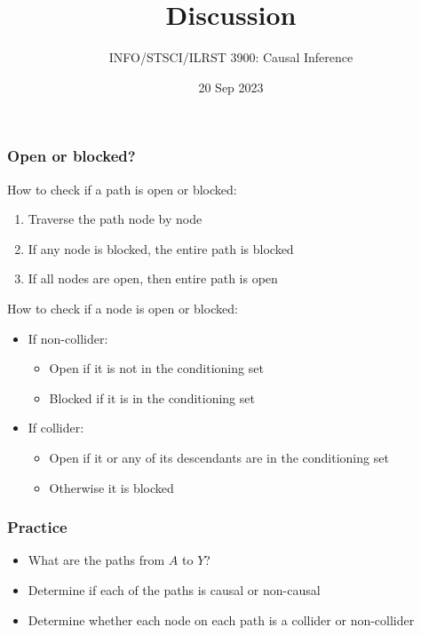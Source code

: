 \documentclass{beamer}
\title{Discussion}
\author{INFO/STSCI/ILRST 3900: Causal Inference}
\date{20 Sep 2023}
\begin{document}
\begin{frame}
  \titlepage
\end{frame}




\begin{frame}
\frametitle{Open or blocked?}

How to check if a path is open or blocked:
\begin{enumerate}
    \item Traverse the path node by node 
    \item If any node is blocked, the entire path is blocked
    \item If all nodes are open, then entire path is open
\end{enumerate}

\vspace{2em}

How to check if a node is open or blocked:
\begin{itemize}
    \item If non-collider:
    \begin{itemize}
        \item Open if it is not in the conditioning set
        \item Blocked if it is in the conditioning set
    \end{itemize}
    \item If collider:
    \begin{itemize}
        \item Open if it or any of its descendants are in the conditioning set
        \item Otherwise it is blocked
    \end{itemize}
\end{itemize}

\end{frame}


\begin{frame}
\frametitle{Practice}

  \begin{figure}[t]
\end{figure}

\begin{itemize}
    \item What are the paths from $A$ to $Y$?
    \item Determine if each of the paths is causal or non-causal
    \item Determine whether each node on each path is a collider or non-collider
\end{itemize}


\end{frame}
\end{document}

